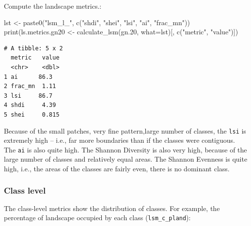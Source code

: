 \documentclass[
  letterpaper,
  DIV=11,
  numbers=noendperiod]{scrartcl}
\newenvironment{Shaded}{\begin{snugshade}}{\end{snugshade}}
\newcommand{\AttributeTok}[1]{\textcolor[rgb]{0.40,0.45,0.13}{#1}}
\newcommand{\ConstantTok}[1]{\textcolor[rgb]{0.56,0.35,0.01}{#1}}
\newcommand{\DecValTok}[1]{\textcolor[rgb]{0.68,0.00,0.00}{#1}}
\newcommand{\FloatTok}[1]{\textcolor[rgb]{0.68,0.00,0.00}{#1}}
\newcommand{\FunctionTok}[1]{\textcolor[rgb]{0.28,0.35,0.67}{#1}}
\newcommand{\NormalTok}[1]{\textcolor[rgb]{0.00,0.23,0.31}{#1}}
\newcommand{\OtherTok}[1]{\textcolor[rgb]{0.00,0.23,0.31}{#1}}
\newcommand{\SpecialCharTok}[1]{\textcolor[rgb]{0.37,0.37,0.37}{#1}}
\newcommand{\StringTok}[1]{\textcolor[rgb]{0.13,0.47,0.30}{#1}}
\begin{document}
Compute the landscape metrics.:

\begin{Shaded}
\begin{Highlighting}[]
\NormalTok{lst }\OtherTok{\textless{}{-}} \FunctionTok{paste0}\NormalTok{(}\StringTok{"lsm\_l\_"}\NormalTok{, }\FunctionTok{c}\NormalTok{(}\StringTok{"shdi"}\NormalTok{, }\StringTok{"shei"}\NormalTok{, }\StringTok{"lsi"}\NormalTok{, }\StringTok{"ai"}\NormalTok{,  }\StringTok{"frac\_mn"}\NormalTok{))}
\FunctionTok{print}\NormalTok{(ls.metrics.gn20 }\OtherTok{\textless{}{-}} \FunctionTok{calculate\_lsm}\NormalTok{(gn}\FloatTok{.20}\NormalTok{, }\AttributeTok{what=}\NormalTok{lst)[, }\FunctionTok{c}\NormalTok{(}\StringTok{"metric"}\NormalTok{, }\StringTok{"value"}\NormalTok{)])}
\end{Highlighting}
\end{Shaded}

\begin{verbatim}
# A tibble: 5 x 2
  metric   value
  <chr>    <dbl>
1 ai      86.3  
2 frac_mn  1.11 
3 lsi     86.7  
4 shdi     4.39 
5 shei     0.815
\end{verbatim}

Because of the small patches, very fine pattern,large number of classes,
the \texttt{lsi} is extremely high -- i.e., far more boundaries than if
the classes were contiguous. The \texttt{ai} is also quite high. The
Shannon Diversity is also very high, because of the large number of
classes and relatively equal areas. The Shannon Evenness is quite high,
i.e., the areas of the classes are fairly even, there is no dominant
class.

\hypertarget{class-level}{%
\subsubsection{Class level}\label{class-level}}

The class-level metrics show the distribution of classes. For example,
the percentage of landscape occupied by each class
(\texttt{lsm\_c\_pland}):

\begin{Shaded}
\end{Shaded}
\end{document}
